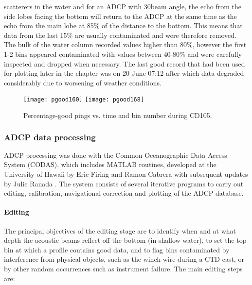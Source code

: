scatterers in the water and for an ADCP with 30\deg beam angle,
the echo from the side lobes facing the bottom will return to the
ADCP at the same time as the echo from the main lobe at 85\% of
the distance to the bottom. This means that data from the last
15\% are usually contaminated and were therefore removed. The bulk
of the water column recorded values higher than 80\%, however the
first 1-2 bins appeared contaminated with values between 40-80\%
and were carefully inspected and dropped when necessary. The last
good record that had been used for plotting later in the chapter
was on 20 June 07:12 after which data degraded considerably due to
worsening of weather conditions.
\begin{figure}
  \centering
  \texttt{[image: pgood160]}
  \texttt{[image: pgood168]}
  \caption{Percentage-good pings vs. time and bin number during CD105.}
  \label{fig:cd105pg}
\end{figure}

\subsubsection{ADCP data processing}
ADCP processing was done with the Common Oceanographic Data Access
System (CODAS), which includes MATLAB routines, developed at the
University of Hawaii by Eric Firing and Ramon Cabrera with
subsequent updates by Julie Ranada \citep{Codas}. The system
consists of several iterative programs to carry out editing,
calibration, navigational correction and plotting of the ADCP
database.
%
\paragraph{Editing}
The principal objectives of the editing stage are to identify when
and at what depth the acoustic beams reflect off the bottom (in
shallow water), to set the top bin at which a profile contains
good data, and to flag bins contaminated by interference from
physical objects, such as the winch wire during a CTD cast, or by
other random occurrences such as instrument failure. The main
editing steps are:


